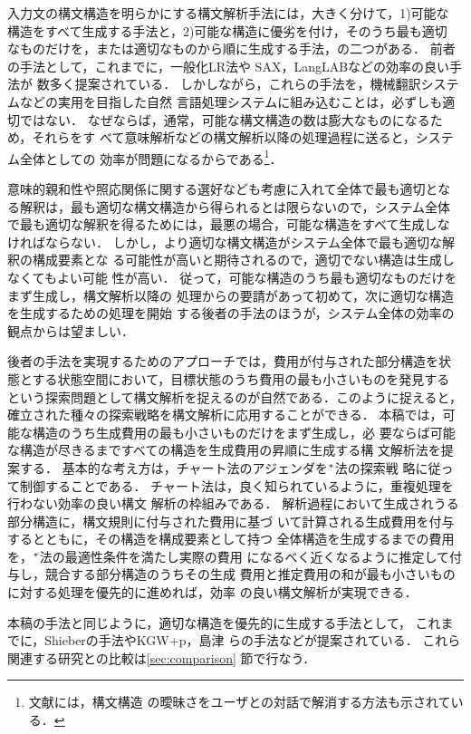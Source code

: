 入力文の構文構造を明らかにする構文解析手法には，大きく分けて，1)可能な
構造をすべて生成する手法と，2)可能な構造に優劣を付け，そのうち最も適切
なものだけを，または適切なものから順に生成する手法，の二つがある．
前者の手法として，これまでに，一般化LR法\cite{Tomita85}や
SAX\cite{Matsumoto86}，LangLAB\cite{Tokunaga88}などの効率の良い手法が
数多く提案されている．
しかしながら，これらの手法を，機械翻訳システムなどの実用を目指した自然
言語処理システムに組み込むことは，必ずしも適切ではない．
なぜならば，通常，可能な構文構造の数は膨大なものになるため，それらをす
べて意味解析などの構文解析以降の処理過程に送ると，システム全体としての
効率が問題になるからである\footnote{文献\cite{Tomita85}には，構文構造
の曖昧さをユーザとの対話で解消する方法も示されている．}．

意味的親和性や照応関係に関する選好なども考慮に入れて全体で最も適切とな
る解釈は，最も適切な構文構造から得られるとは限らないので，システム全体
で最も適切な解釈を得るためには，最悪の場合，可能な構造をすべて生成しな
ければならない．
しかし，より適切な構文構造がシステム全体で最も適切な解釈の構成要素とな
る可能性が高いと期待されるので，適切でない構造は生成しなくてもよい可能
性が高い． 
従って，可能な構造のうち最も適切なものだけをまず生成し，構文解析以降の
処理からの要請があって初めて，次に適切な構造を生成するための処理を開始
する後者の手法のほうが，システム全体の効率の観点からは望ましい．

後者の手法を実現するためのアプローチでは，費用が付与された部分構造を状
態とする状態空間において，目標状態のうち費用の最も小さいものを発見する
という探索問題として構文解析を捉えるのが自然である．このように捉えると，
確立された種々の探索戦略を構文解析に応用することができる．
本稿では，可能な構造のうち生成費用の最も小さいものだけをまず生成し，必
要ならば可能な構造が尽きるまですべての構造を生成費用の昇順に生成する構
文解析法を提案する．
基本的な考え方は，チャート法のアジェンダ\cite{Kay80}を$^*$法の探索戦
略\cite{Nilsson80}に従って制御することである\cite{Yoshimi90}．
チャート法は，良く知られているように，重複処理を行わない効率の良い構文
解析の枠組みである．
解析過程において生成されうる部分構造に，構文規則に付与された費用に基づ
いて計算される生成費用を付与するとともに，その構造を構成要素として持つ
全体構造を生成するまでの費用を，$^*$法の最適性条件を満たし実際の費用
になるべく近くなるように推定して付与し，競合する部分構造のうちその生成
費用と推定費用の和が最も小さいものに対する処理を優先的に進めれば，効率
の良い構文解析が実現できる．

本稿の手法と同じように，適切な構造を優先的に生成する手法として，
これまでに，Shieberの手法\cite{Shieber83}やKGW+p\cite{Tsujii88}，島津
らの手法\cite{Shimazu89}などが提案されている． 
これら関連する研究との比較は\ref{sec:comparison} 節で行なう．

